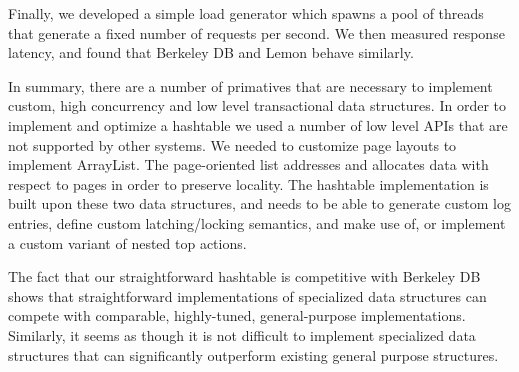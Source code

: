 \documentclass[10pt,letterpaper,twocolumn,english]{article}
\newcommand{\yad}{Lemon\xspace}
\newcommand{\eab}[1]{\textcolor{red}{\bf EAB: #1}}
\newcommand{\rcs}[1]{\textcolor{green}{\bf RCS: #1}}
\begin{document}


%
%

Finally, we developed a simple load generator which spawns a pool of threads that
generate a fixed number of requests per second.  We then measured
response latency, and found that Berkeley DB and \yad behave
similarly.

In summary, there are a number of primatives that are necessary to
implement custom, high concurrency and low level transactional data
structures.  In order to implement and optimize a hashtable we used a
number of low level APIs that are not supported by other systems.  We
needed to customize page layouts to implement ArrayList.  The page-oriented
list addresses and allocates data with respect to pages in order to
preserve locality.  The hashtable implementation is built upon these two
data structures, and needs to be able to generate custom log entries,
define custom latching/locking semantics, and make use of, or
implement a custom variant of nested top actions.

The fact that our straightforward hashtable is competitive 
with Berkeley DB shows that
straightforward implementations of specialized data structures can 
compete with comparable, highly-tuned, general-purpose implementations.  
Similarly, it seems as though it is not difficult to implement specialized 
data structures that can significantly outperform existing 
general purpose structures.
\end{document}
